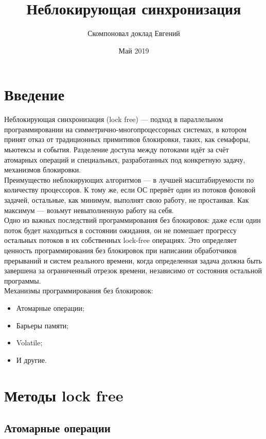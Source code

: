 \documentclass{article}
\title{Неблокирующая синхронизация}
\author{Скомпоновал доклад Евгений}
\date{Май 2019}
\begin{document}
\maketitle
\newpage

\section{Введение}

Неблокирующая синхронизация (lock free) — подход в параллельном программировании на симметрично-многопроцессорных системах, в котором принят отказ от традиционных примитивов блокировки, таких, как семафоры, мьютексы и события. Разделение доступа между потоками идёт за счёт атомарных операций и специальных, разработанных под конкретную задачу, механизмов блокировки.\\

Преимущество неблокирующих алгоритмов — в лучшей масштабируемости по количеству процессоров. К тому же, если ОС прервёт один из потоков фоновой задачей, остальные, как минимум, выполнят свою работу, не простаивая. Как максимум — возьмут невыполненную работу на себя.\\

Одно из важных последствий программирования без блокировок: даже если один поток будет находиться в состоянии ожидания, он не помешает прогрессу остальных потоков в их собственных lock-free операциях. Это определяет ценность программирования без блокировок при написании обработчиков прерываний и систем реального времени, когда определенная задача должна быть завершена за ограниченный отрезок времени, независимо от состояния остальной программы.\\

Механизмы программирования без блокировок:
\begin{itemize}
 \item Атомарные операции;
 \item Барьеры памяти;
 \item Volatile;
 \item И другие.
\end{itemize}

\section{Методы lock free}
\subsection{Атомарные операции}
\end{document}
